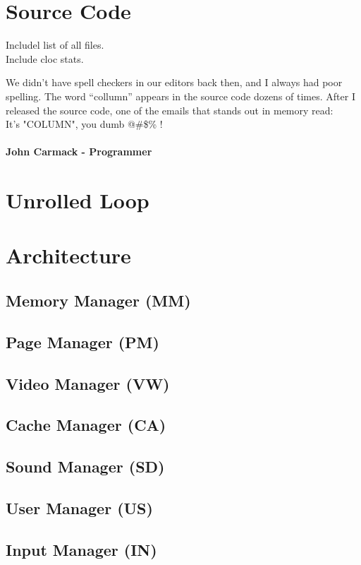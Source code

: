 \documentclass[book.tex]{subfiles}
\begin{document}
\section{Source Code}

Includel list of all files.\\
Include cloc stats.

 \begin{fancyquotes}
   We didn't have spell checkers in our editors back then, and I always had poor spelling.  The word “collumn” appears in the source code dozens of times.  After I released the source code, one of the emails that stands out in memory read:
 \bigskip \\
It's "COLUMN", you dumb @\#\$\% !\\
 \bigskip \\
\textbf{John Carmack - Programmer}
 \end{fancyquotes}


\section{Unrolled Loop}
\section{Architecture}
\subsection{Memory Manager (MM)}
\subsection{Page Manager (PM)}
\subsection{Video Manager (VW)}
\subsection{Cache Manager (CA)}
\subsection{Sound Manager (SD)}
\subsection{User Manager (US)}
\subsection{Input Manager (IN)}
\end{document}
